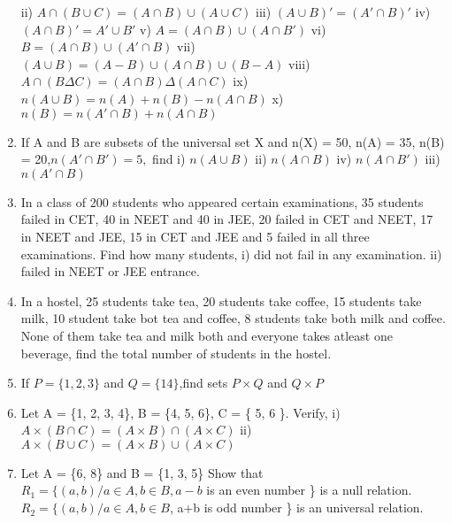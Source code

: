 \documentclass[14pt]{article}
\begin{document}
\begin{multicols}{2}
\begin{enumerate}[resume]
ii)	$A\cap (B\cup C)=(A\cap B)\cup (A \cup C)$
iii) $(A\cup B)' = (A'\cap B)'         $
iv)	$ (A\cap B)' = A'\cup B'          $
v)	$	 A = (A\cap B)\cup (A\cap B') $
vi)	$	 B = (A\cap B)\cup (A'\cap B) $
vii) $(A\cup B)=(A-B)\cup (A\cap B)\cup (B-A)$
viii)	$A \cap (B\Delta C) = (A\cap B) \Delta (A\cap C)$
ix) $n (A\cup B) = n(A) + n(B) - n(A\cap B)$ 
x) $n (B) = n(A'\cap B) + n(A\cap B)$

\item If A and B are subsets of the universal set X and n(X) = 50, n(A) = 35, n(B) = 20,$ n(A'\cap B') = 5,$ find i) $n (A\cup B)$ ii) $n(A\cap B)$
iv) $ n(A\cap B')$
iii) $ n(A'\cap B) $

\item In a class of 200 students who appeared
certain examinations, 35 students failed
in CET, 40 in NEET and 40 in JEE,
20 failed in CET and NEET, 17 in NEET
and JEE, 15 in CET and JEE and 5 failed
in all three examinations. Find how many
students,
i)	did not fail in any examination.
ii) failed in NEET or JEE entrance.
		 
		 
\item In a hostel, 25 students take tea, 20 students
take coffee, 15 students take milk, 10
student take bot tea and coffee, 8 students
take both milk and coffee. None of them
take tea and milk both and everyone takes
atleast one beverage, find the total number
of students in the hostel.

\item If $P = \{1, 2, 3 \} $ and $Q = \{14 \}$,find sets $P \times Q $ and $Q \times P$

\item Let A = \{1, 2, 3, 4\}, B = \{4, 5, 6\}, C = \{ 5, 6 \}.
 Verify, i) $A \times (B \cap C) = (A \times B) \cap (A \times C)$				
ii) $ A \times (B \cup C) = (A \times B) \cup (A \times C)$

\item Let A = \{6, 8\} and B = \{1, 3, 5\} Show that $ R_1 = \{ (a, b) / a \in A, b\in B, a - b$
is an even number \} is a null relation.
$R_2 = \{(a, b)/a \in A, b \in B$, a+b is odd number \}
is an universal relation.
\end{enumerate} 



\end{multicols}
 
\end{document}
